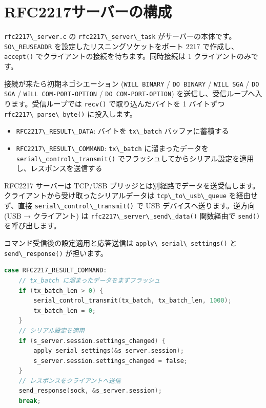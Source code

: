 \documentclass[10pt,twoside,openany,a4j]{ltjsbook}
\newcommand{\passthrough}[1]{#1}
\providecommand{\tightlist}{%
  \setlength{\itemsep}{0pt}\setlength{\parskip}{0pt}}
\begin{document}
\section{RFC2217サーバーの構成}\label{rfc2217ux30b5ux30fcux30d0ux30fcux306eux69cbux6210}

\passthrough{\lstinline!rfc2217\_server.c!} の
\passthrough{\lstinline!rfc2217\_server\_task!}
がサーバーの本体です。\passthrough{\lstinline!SO\_REUSEADDR!}
を設定したリスニングソケットをポート 2217
で作成し、\passthrough{\lstinline!accept()!}
でクライアントの接続を待ちます。同時接続は 1 クライアントのみです。

接続が来たら初期ネゴシエーション (\passthrough{\lstinline!WILL BINARY!}
/ \passthrough{\lstinline!DO BINARY!} /
\passthrough{\lstinline!WILL SGA!} / \passthrough{\lstinline!DO SGA!} /
\passthrough{\lstinline!WILL COM-PORT-OPTION!} /
\passthrough{\lstinline!DO COM-PORT-OPTION!})
を送信し、受信ループへ入ります。受信ループでは
\passthrough{\lstinline!recv()!} で取り込んだバイトを 1 バイトずつ
\passthrough{\lstinline!rfc2217\_parse\_byte()!} に投入します。

\begin{itemize}
\tightlist
\item
  \passthrough{\lstinline!RFC2217\_RESULT\_DATA!}: バイトを
  \passthrough{\lstinline!tx\_batch!} バッファに蓄積する
\item
  \passthrough{\lstinline!RFC2217\_RESULT\_COMMAND!}:
  \passthrough{\lstinline!tx\_batch!} に溜まったデータを
  \passthrough{\lstinline!serial\_control\_transmit()!}
  でフラッシュしてからシリアル設定を適用し、レスポンスを送信する
\end{itemize}

RFC2217 サーバーは TCP/USB
ブリッジとは別経路でデータを送受信します。クライアントから受け取ったシリアルデータは
\passthrough{\lstinline!tcp\_to\_usb\_queue!} を経由せず、直接
\passthrough{\lstinline!serial\_control\_transmit()!} で USB
デバイスへ送ります。逆方向 (USB → クライアント) は
\passthrough{\lstinline!rfc2217\_server\_send\_data()!} 関数経由で
\passthrough{\lstinline!send()!} を呼び出します。

コマンド受信後の設定適用と応答送信は
\passthrough{\lstinline!apply\_serial\_settings()!} と
\passthrough{\lstinline!send\_response()!} が担います。

\begin{lstlisting}[language=C]
case RFC2217_RESULT_COMMAND:
    // tx_batch に溜まったデータをまずフラッシュ
    if (tx_batch_len > 0) {
        serial_control_transmit(tx_batch, tx_batch_len, 1000);
        tx_batch_len = 0;
    }
    // シリアル設定を適用
    if (s_server.session.settings_changed) {
        apply_serial_settings(&s_server.session);
        s_server.session.settings_changed = false;
    }
    // レスポンスをクライアントへ送信
    send_response(sock, &s_server.session);
    break;
\end{lstlisting}
\end{document}
